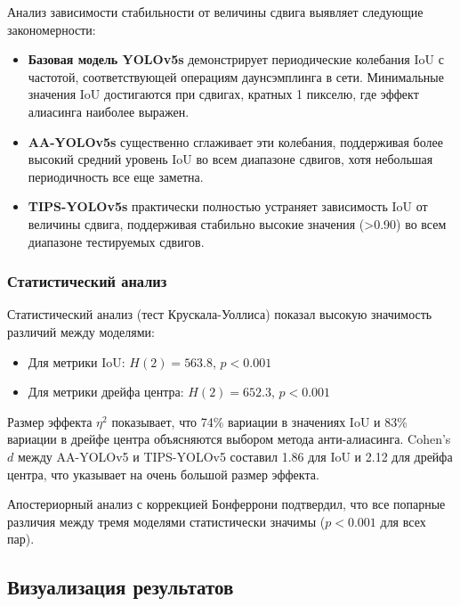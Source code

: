 Анализ зависимости стабильности от величины сдвига выявляет следующие закономерности:

\begin{itemize}
    \item \textbf{Базовая модель YOLOv5s} демонстрирует периодические колебания IoU с частотой, соответствующей операциям даунсэмплинга в сети. Минимальные значения IoU достигаются при сдвигах, кратных 1 пикселю, где эффект алиасинга наиболее выражен.
    
    \item \textbf{AA-YOLOv5s} существенно сглаживает эти колебания, поддерживая более высокий средний уровень IoU во всем диапазоне сдвигов, хотя небольшая периодичность все еще заметна.
    
    \item \textbf{TIPS-YOLOv5s} практически полностью устраняет зависимость IoU от величины сдвига, поддерживая стабильно высокие значения (>0.90) во всем диапазоне тестируемых сдвигов.
\end{itemize}

\subsubsection{Статистический анализ}
\label{sec:experiments:detection:statistics}

Статистический анализ (тест Крускала-Уоллиса) показал высокую значимость различий между моделями:
\begin{itemize}
    \item Для метрики IoU: $H(2) = 563.8$, $p < 0.001$
    \item Для метрики дрейфа центра: $H(2) = 652.3$, $p < 0.001$
\end{itemize}

Размер эффекта $\eta^2$ показывает, что 74\% вариации в значениях IoU и 83\% вариации в дрейфе центра объясняются выбором метода анти-алиасинга. Cohen's $d$ между AA-YOLOv5 и TIPS-YOLOv5 составил 1.86 для IoU и 2.12 для дрейфа центра, что указывает на очень большой размер эффекта.

Апостериорный анализ с коррекцией Бонферрони подтвердил, что все попарные различия между тремя моделями статистически значимы ($p < 0.001$ для всех пар).

\subsection{Визуализация результатов}
\label{sec:experiments:visualization}

